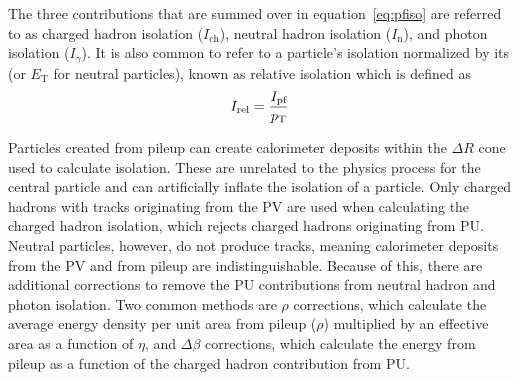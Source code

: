 The three contributions that are summed over in equation~\ref{eq:pfiso} are referred to as charged hadron isolation ($I_\text{ch}$), neutral hadron isolation ($I_\text{n}$), and photon isolation ($I_\gamma$). It is also common to refer to a particle's isolation normalized by its \pt (or $E_\mathrm{T}$ for neutral particles), known as relative isolation which is defined as
\begin{equation}
	\label{eq:reliso}
	I_\text{rel}=\frac{I_\text{pf}}{p_\mathrm{T}}
\end{equation}

Particles created from pileup can create calorimeter deposits within the $\Delta R$ cone used to calculate isolation. These are unrelated to the physics process for the central particle and can artificially inflate the isolation of a particle. Only charged hadrons with tracks originating from the PV are used when calculating the charged hadron isolation, which rejects charged hadrons originating from PU. Neutral particles, however, do not produce tracks, meaning calorimeter deposits from the PV and from pileup are indistinguishable. Because of this, there are additional corrections to remove the PU contributions from neutral hadron and photon isolation. Two common methods are $\rho$ corrections, which calculate the average energy density per unit area from pileup ($\rho$) multiplied by an effective area as a function of $\eta$, and $\Delta\beta$ corrections, which calculate the energy from pileup as a function of the charged hadron contribution from PU. 

